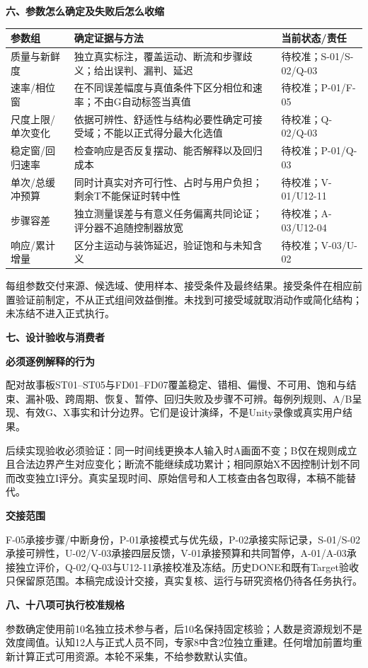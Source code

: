 \documentclass[11pt,a4paper]{article}
\newcommand{\reviewsection}[1]{\par\Needspace{6\baselineskip}\begin{center}{\titlelatin\titlecjk\bfseries\fontsize{14}{20}\selectfont #1}\end{center}}
\newcommand{\reviewsubsection}[1]{\par\Needspace{4\baselineskip}\begin{center}{\titlelatin\titlecjk\bfseries\fontsize{12}{18}\selectfont #1}\end{center}}
\begin{document}
\reviewsection{六、参数怎么确定及失败后怎么收缩}
\begin{longtable}{L{34mm}L{73mm}L{47mm}}
参数组 & 确定证据与方法 & 当前状态/责任\\\hline
质量与新鲜度 & 独立真实标注，覆盖运动、断流和步骤歧义；给出误判、漏判、延迟 & 待校准；S-01/S-02/Q-03\\
速率/相位窗 & 在不同误差幅度与真值条件下区分相位和速率；不由G自动标签当真值 & 待校准；P-01/F-05\\
尺度上限/单次变化 & 依据可辨性、舒适性与结构必要性确定可接受域；不能以正式得分最大化选值 & 待校准；Q-02/Q-03\\
稳定窗/回归速率 & 检查响应是否反复摆动、能否解释以及回归成本 & 待校准；P-01/Q-03\\
单次/总缓冲预算 & 同时计真实对齐可行性、占时与用户负担；剩余T不能保证时转中性 & 待校准；V-01/U12-11\\
步骤容差 & 独立测量误差与有意义任务偏离共同论证；评分器不追随控制器放宽 & 待校准；A-03/U12-04\\
响应/累计增量 & 区分主运动与装饰延迟，验证饱和与未知含义 & 待校准；V-03/U-02\\
\end{longtable}

每组参数交付来源、候选域、使用样本、接受条件及最终结果。接受条件在相应前置验证前制定，不从正式组间效益倒推。未找到可接受域就取消动作或简化结构；未冻结不进入正式执行。

\newpage
\reviewsection{七、设计验收与消费者}
\reviewsubsection{7.1 必须逐例解释的行为}
配对故事板ST01--ST05与FD01--FD07覆盖稳定、错相、偏慢、不可用、饱和与结束、漏补吸、跨周期、恢复、暂停、回归失败及步骤不可辨。每例列规则、A/B呈现、有效G、X事实和计分边界。它们是设计演绎，不是Unity录像或真实用户结果。

后续实现验收必须验证：同一时间线更换本人输入时A画面不变；B仅在规则成立且合法边界产生对应变化；断流不能继续成功累计；相同原始X不因控制计划不同而改变独立I评分。真实呈现时间、原始信号和人工核查由各包取得，本稿不能替代。

\reviewsubsection{7.2 交接范围}
F-05承接步骤/中断身份，P-01承接模式与优先级，P-02承接实际记录，S-01/S-02承接可辨性，U-02/V-03承接四层反馈，V-01承接预算和共同暂停，A-01/A-03承接独立评价，Q-02/Q-03与U12-11承接校准及冻结。历史DONE和既有Target验收只保留原范围。本稿完成设计交接，真实复核、运行与研究资格仍待各任务执行。

\newpage\reviewsection{八、十八项可执行校准规格}
参数确定使用前10名独立技术参与者，后10名保持固定核验；人数是资源规划不是效度阈值。认知12人与正式人员不同，专家8中含2位独立重建。任何增加前置均重新计算正式可用资源。本轮不采集，不给参数默认实值。
\end{document}
